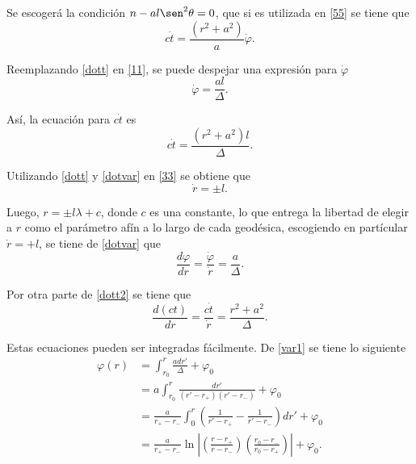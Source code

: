 Se escoger\'a la condici\'on $n-al\sen^2\theta=0$, que si es utilizada en \eqref{55} se tiene que
\begin{equation}\label{dott}
c\dot{t}=\frac{(r^2+a^2)}{a}\dot{\varphi}.
\end{equation}

Reemplazando \eqref{dott} en \eqref{11}, se puede despejar una expresi\'on para $\dot{\varphi}$
\begin{equation}\label{dotvar}
\dot{\varphi}=\frac{al}{\Delta}.
\end{equation}

As\'i, la ecuaci\'on para $c\dot{t}$ es
\begin{equation}\label{dott2}
c\dot{t}=\frac{(r^2+a^2)l}{\Delta}.
\end{equation}

Utilizando \eqref{dott} y \eqref{dotvar} en \eqref{33} se obtiene que
\begin{equation}
\dot{r}=\pm l.
\end{equation}

Luego, $r=\pm l\lambda+c$, donde $c$ es una constante, lo que entrega la libertad de elegir a $r$ como el par\'ametro af\'in a lo largo de cada geod\'esica, escogiendo en part\'icular $\dot{r}=+l$, se tiene de \eqref{dotvar} que
\begin{equation}\label{var1}
\frac{d \varphi}{dr}=\frac{\dot{\varphi}}{\dot{r}}=\frac{a}{\Delta}.
\end{equation}

Por otra parte de \eqref{dott2} se tiene que
\begin{equation}\label{t}
\frac{d(ct)}{dr}=\frac{c\dot{t}}{\dot{r}}=\frac{r^2+a^2}{\Delta}.
\end{equation}
 
Estas ecuaciones pueden ser integradas f\'acilmente. De \eqref{var1}  se tiene lo siguiente 
\begin{equation}
\begin{aligned}
\varphi(r)&=\int_{r_0}^r \frac{adr'}{\Delta} + \varphi_0\\
&=a\int_{r_0}^r\frac{dr'}{(r'-r_+)(r'-r_-)} + \varphi_0\\
&=\frac{a}{r_+-r_-}\int_{0}^r\left(\frac{1}{r'-r_+} - \frac{1}{r'-r_-} \right)dr'+\varphi_0\\
&=\frac{a}{r_+-r_-}\ln \left|\left(\frac{r-r_+}{r-r_-}\right)\left(\frac{r_0-r_-}{r_0-r_+} \right)\right| + \varphi_0.
\end{aligned}
\end{equation}
 
